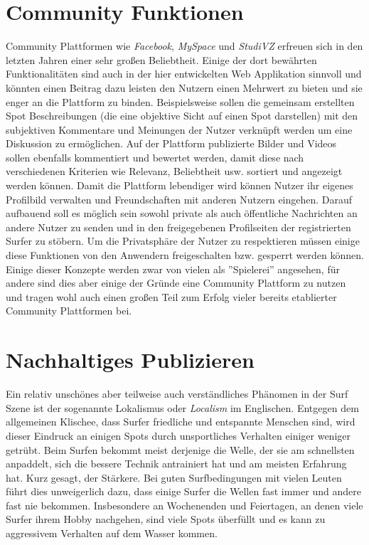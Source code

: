 \section{Community Funktionen}
Community Plattformen wie \textit{Facebook}, \textit{MySpace} und
\textit{StudiVZ} erfreuen sich in den letzten Jahren einer sehr großen
Beliebtheit. Einige der dort bewährten Funktionalitäten sind auch in
der hier entwickelten Web Applikation sinnvoll und könnten einen
Beitrag dazu leisten den Nutzern einen Mehrwert zu bieten und sie
enger an die Plattform zu binden. Beispielsweise sollen die gemeinsam
erstellten Spot Beschreibungen (die eine objektive Sicht auf einen
Spot darstellen) mit den subjektiven Kommentare und Meinungen der
Nutzer verknüpft werden um eine Diskussion zu ermöglichen. Auf der
Plattform publizierte Bilder und Videos sollen ebenfalls kommentiert
und bewertet werden, damit diese nach verschiedenen Kriterien wie
Relevanz, Beliebtheit usw. sortiert und angezeigt werden können. Damit
die Plattform lebendiger wird können Nutzer ihr eigenes Profilbild
verwalten und Freundschaften mit anderen Nutzern eingehen. Darauf
aufbauend soll es möglich sein sowohl private als auch öffentliche
Nachrichten an andere Nutzer zu senden und in den freigegebenen
Profilseiten der registrierten Surfer zu stöbern. Um die Privatsphäre
der Nutzer zu respektieren müssen einige diese Funktionen von den
Anwendern freigeschalten bzw. gesperrt werden können. Einige dieser
Konzepte werden zwar von vielen als ''Spielerei'' angesehen, für
andere sind dies aber einige der Gründe eine Community Plattform zu
nutzen und tragen wohl auch einen großen Teil zum Erfolg vieler
bereits etablierter Community Plattformen bei.

\section{Nachhaltiges Publizieren}
Ein relativ unschönes aber teilweise auch verständliches Phänomen in
der Surf Szene ist der sogenannte Lokalismus oder \textit{Localism} im
Englischen. Entgegen dem allgemeinen Klischee, dass Surfer friedliche
und entspannte Menschen sind, wird dieser Eindruck an einigen Spots
durch unsportliches Verhalten einiger weniger getrübt. Beim Surfen
bekommt meist derjenige die Welle, der sie am schnellsten anpaddelt,
sich die bessere Technik antrainiert hat und am meisten Erfahrung
hat. Kurz gesagt, der Stärkere. Bei guten Surfbedingungen mit vielen
Leuten führt dies unweigerlich dazu, dass einige Surfer die Wellen
fast immer und andere fast nie bekommen. Insbesondere an Wochenenden
und Feiertagen, an denen viele Surfer ihrem Hobby nachgehen, sind
viele Spots überfüllt und es kann zu aggressivem Verhalten auf dem
Wasser kommen.

